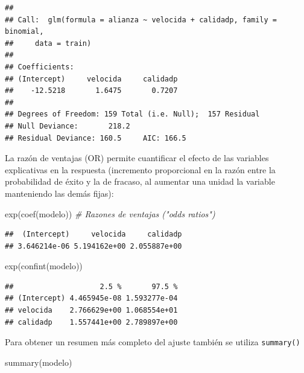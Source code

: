 \documentclass[
  spanish,
]{book}
\newenvironment{Shaded}{\begin{snugshade}}{\end{snugshade}}
\newcommand{\CommentTok}[1]{\textcolor[rgb]{0.56,0.35,0.01}{\textit{#1}}}
\newcommand{\FunctionTok}[1]{\textcolor[rgb]{0.00,0.00,0.00}{#1}}
\newcommand{\NormalTok}[1]{#1}
\theoremstyle{break}
\theoremstyle{definition}
\theoremstyle{definition}
\theoremstyle{definition}
\theoremstyle{definition}
\theoremstyle{remark}
\begin{document}
\begin{verbatim}
## 
## Call:  glm(formula = alianza ~ velocida + calidadp, family = binomial, 
##     data = train)
## 
## Coefficients:
## (Intercept)     velocida     calidadp  
##    -12.5218       1.6475       0.7207  
## 
## Degrees of Freedom: 159 Total (i.e. Null);  157 Residual
## Null Deviance:       218.2 
## Residual Deviance: 160.5     AIC: 166.5
\end{verbatim}

La razón de ventajas (OR) permite cuantificar el efecto de las variables explicativas en la respuesta (incremento proporcional en la razón entre la probabilidad de éxito y la de fracaso, al aumentar una unidad la variable manteniendo las demás fijas):

\begin{Shaded}
\begin{Highlighting}[]
\FunctionTok{exp}\NormalTok{(}\FunctionTok{coef}\NormalTok{(modelo))  }\CommentTok{\# Razones de ventajas ("odds ratios")}
\end{Highlighting}
\end{Shaded}

\begin{verbatim}
##  (Intercept)     velocida     calidadp 
## 3.646214e-06 5.194162e+00 2.055887e+00
\end{verbatim}

\begin{Shaded}
\begin{Highlighting}[]
\FunctionTok{exp}\NormalTok{(}\FunctionTok{confint}\NormalTok{(modelo))}
\end{Highlighting}
\end{Shaded}

\begin{verbatim}
##                    2.5 %       97.5 %
## (Intercept) 4.465945e-08 1.593277e-04
## velocida    2.766629e+00 1.068554e+01
## calidadp    1.557441e+00 2.789897e+00
\end{verbatim}

Para obtener un resumen más completo del ajuste también se utiliza \texttt{summary()}

\begin{Shaded}
\begin{Highlighting}[]
\FunctionTok{summary}\NormalTok{(modelo)}
\end{Highlighting}
\end{Shaded}
\end{document}

